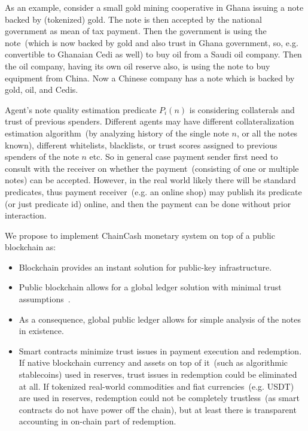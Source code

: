 \documentclass{article}   %
\newcommand{\cc}{ChainCash}
\begin{document}
As an example, consider a small gold mining cooperative in Ghana issuing a note backed by (tokenized) gold. The note is then accepted by the national government as mean of tax payment. Then the government is using the note~(which is now backed by gold and also trust in Ghana government, so, e.g. convertible to Ghanaian Cedi as well) to buy oil from a Saudi oil company. Then the oil company, having its own oil reserve also, is using the note to buy equipment from China. Now a Chinese company has a note which is backed by gold, oil, and Cedis. 

Agent's note quality estimation predicate $P_i(n)$ is considering collaterals and trust of previous spenders. Different agents may have different 
collateralization estimation algorithm~(by analyzing history of the single note $n$, or all the notes known), different whitelists, blacklists, or trust scores assigned to previous spenders of the note $n$ etc. So in general case payment sender first need to consult with the receiver on whether the payment~(consisting of one or multiple notes) can be accepted. However, in the real world likely there will be standard predicates, thus payment receiver~(e.g. an online shop) may publish its predicate (or just predicate id) online, and then the payment can be done without prior interaction.

We propose to implement \cc{} monetary system on top of a public blockchain as:

\begin{itemize}
  \item{} Blockchain provides an instant solution for public-key infrastructure.
  \item{} Public blockchain allows for a global ledger solution with minimal trust assumptions~\cite{kya}.
  \item{} As a consequence, global public ledger allows for simple analysis of the notes in existence.
  \item{} Smart contracts minimize trust issues in payment execution and redemption. If native blockchain currency and assets on top of it~(such as algorithmic stablecoins) used in reserves, trust issues in redemption could be eliminated at all. If tokenized real-world commodities and fiat currencies~(e.g. USDT) are used in reserves, redemption could not be completely trustless~(as smart contracts do not have power off the chain), but at least there is transparent accounting in on-chain part of redemption. 
\end{itemize}
\end{document}
